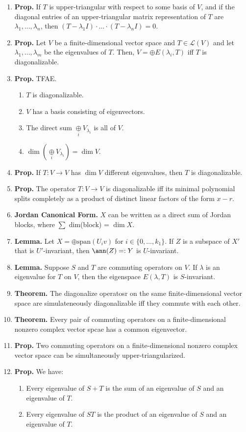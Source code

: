 \begin{enumerate}
	\item \textbf{Prop. } If $T$ is upper-triangular with respect to some basis of $V$, and if the diagonal entries of an upper-triangular matrix representation of $T$ are $\lambda_1,\dots,\lambda_n$, then $(T-\lambda_1I) \cdot \dots \cdot (T-\lambda_nI)=0$. 
	\item \textbf{Prop. } Let $V$ be a finite-dimensional vector space and $T \in \mathscr{L}(V)$ and let $\lambda_1,\dots,\lambda_m$ be the eigenvalues of $T$. Then, $V = \oplus E(\lambda_i, T)$ iff $T$ is diagonalizable. 
	\item \textbf{Prop. } TFAE. 
	\begin{enumerate}
		\item $T$ is diagonalizable. 
		\item $V$ has a basis consisting of eigenvectors. 
		\item The direct sum $\underset{i}{\oplus} V_{\lambda_i}$ is all of $V$. 
		\item $\dim \left(\underset{i}{\oplus} V_{\lambda_i} \right) = \dim V$. 
	\end{enumerate}
	\item \textbf{Prop. } If $T: V \to V$ has $\dim V$ different eigenvalues, then $T$ is diagonalizable. 
	\item \textbf{Prop. } The operator $T: V \to V$ is diagonalizable iff its minimal polynomial splits completely as a product of distinct linear factors of the form $x-r$. 
	\item \textbf{Jordan Canonical Form. } $X$ can be written as a direct sum of Jordan blocks, where $\sum$ dim(block) = $\dim X$. 
	\item \textbf{Lemma. } Let $X = \oplus \textrm{span}(U_iv)$ for $i \in \{0,\dots,k_1\}$. If $Z$ is a subspace of $X'$ that is $U'$-invariant, then $\ann(Z) =: Y$ is $U$-invariant. 
	\item \textbf{Lemma. } Suppose $S$ and $T$ are commuting operators on $V$. If $\lambda$ is an eigenvalue for $T$ on $V$, then the eigenspace $E(\lambda, T)$ is $S$-invariant. 
	\item \textbf{Theorem. } The diagonalize operatosr on the same finite-dimensional vector space are simulateneously diagonalizable iff they commute with each other. 
	\item \textbf{Theorem. } Every pair of commuting operators on a finite-dimensional nonzero complex vector spcae has a common eigenvector. 
	\item \textbf{Prop. } Two commuting operators on a finite-dimensional nonzero complex vector space can be simultaneously upper-triangularized. 
	\item \textbf{Prop. } We have: 
	\begin{enumerate}
		\item Every eigenvalue of $S+T$ is the sum of an eigenvalue of $S$ and an eigenvalue of $T$. 
		\item Every eigenvalue of $ST$ is the product of an eigenvalue of $S$ and an eigenvalue of $T$. 
	\end{enumerate}
\end{enumerate}


